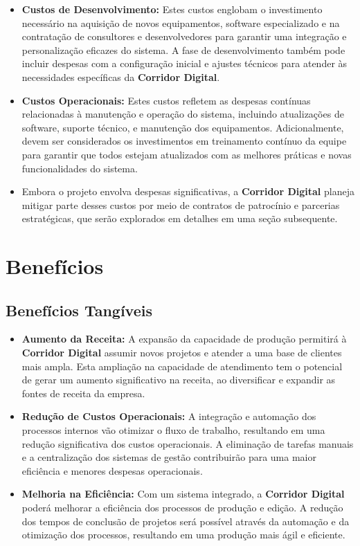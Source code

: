 \begin{itemize}
    \item \textbf{Custos de Desenvolvimento:} Estes custos englobam o investimento necessário na aquisição de novos equipamentos, software especializado e na contratação de consultores e desenvolvedores para garantir uma integração e personalização eficazes do sistema. A fase de desenvolvimento também pode incluir despesas com a configuração inicial e ajustes técnicos para atender às necessidades específicas da \textbf{Corridor Digital}.
    
    \item \textbf{Custos Operacionais:} Estes custos refletem as despesas contínuas relacionadas à manutenção e operação do sistema, incluindo atualizações de software, suporte técnico, e manutenção dos equipamentos. Adicionalmente, devem ser considerados os investimentos em treinamento contínuo da equipe para garantir que todos estejam atualizados com as melhores práticas e novas funcionalidades do sistema.
    
    \item Embora o projeto envolva despesas significativas, a \textbf{Corridor Digital} planeja mitigar parte desses custos por meio de contratos de patrocínio e parcerias estratégicas, que serão explorados em detalhes em uma seção subsequente.
\end{itemize}


\section{Benefícios}

\subsection{Benefícios Tangíveis}

\begin{itemize}
    \item \textbf{Aumento da Receita:} A expansão da capacidade de produção permitirá à \textbf{Corridor Digital} assumir novos projetos e atender a uma base de clientes mais ampla. Esta ampliação na capacidade de atendimento tem o potencial de gerar um aumento significativo na receita, ao diversificar e expandir as fontes de receita da empresa.
    
    \item \textbf{Redução de Custos Operacionais:} A integração e automação dos processos internos vão otimizar o fluxo de trabalho, resultando em uma redução significativa dos custos operacionais. A eliminação de tarefas manuais e a centralização dos sistemas de gestão contribuirão para uma maior eficiência e menores despesas operacionais.
    
    \item \textbf{Melhoria na Eficiência:} Com um sistema integrado, a \textbf{Corridor Digital} poderá melhorar a eficiência dos processos de produção e edição. A redução dos tempos de conclusão de projetos será possível através da automação e da otimização dos processos, resultando em uma produção mais ágil e eficiente.
\end{itemize}


